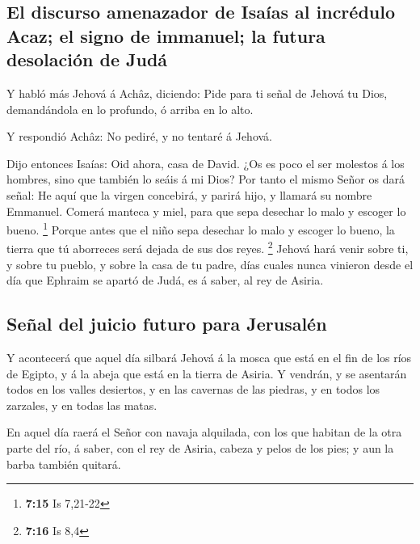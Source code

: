 \hypertarget{el-discurso-amenazador-de-isauxedas-al-incruxe9dulo-acaz-el-signo-de-immanuel-la-futura-desolaciuxf3n-de-juduxe1}{%
\subsection{El discurso amenazador de Isaías al incrédulo Acaz; el signo
de immanuel; la futura desolación de
Judá}\label{el-discurso-amenazador-de-isauxedas-al-incruxe9dulo-acaz-el-signo-de-immanuel-la-futura-desolaciuxf3n-de-juduxe1}}

 Y habló más Jehová á Achâz, diciendo:  Pide
para ti señal de Jehová tu Dios, demandándola en lo profundo, ó arriba
en lo alto.

 Y respondió Achâz: No pediré, y no tentaré á Jehová.

 Dijo entonces Isaías: Oid ahora, casa de David. ¿Os es
poco el ser molestos á los hombres, sino que también lo seáis á mi Dios?
 Por tanto el mismo Señor os dará señal: He aquí que la
virgen concebirá, y parirá hijo, y llamará su nombre Emmanuel.
 Comerá manteca y miel, para que sepa desechar lo malo y
escoger lo bueno. \footnote{\textbf{7:15} Is 7,21-22} 
Porque antes que el niño sepa desechar lo malo y escoger lo bueno, la
tierra que tú aborreces será dejada de sus dos reyes. \footnote{\textbf{7:16}
  Is 8,4}  Jehová hará venir sobre ti, y sobre tu pueblo, y
sobre la casa de tu padre, días cuales nunca vinieron desde el día que
Ephraim se apartó de Judá, es á saber, al rey de Asiria.

\hypertarget{seuxf1al-del-juicio-futuro-para-jerusaluxe9n}{%
\subsection{Señal del juicio futuro para
Jerusalén}\label{seuxf1al-del-juicio-futuro-para-jerusaluxe9n}}

 Y acontecerá que aquel día silbará Jehová á la mosca que
está en el fin de los ríos de Egipto, y á la abeja que está en la tierra
de Asiria.  Y vendrán, y se asentarán todos en los valles
desiertos, y en las cavernas de las piedras, y en todos los zarzales, y
en todas las matas.

 En aquel día raerá el Señor con navaja alquilada, con los
que habitan de la otra parte del río, á saber, con el rey de Asiria,
cabeza y pelos de los pies; y aun la barba también quitará.

